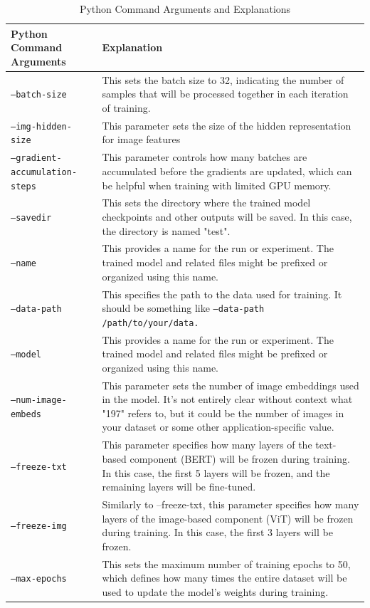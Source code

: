 \begin{table}[hbt]
\centering
\begin{tabular}{|p{6cm}|p{12cm}|}
\hline
\textbf{Python Command Arguments} & \textbf{Explanation} \\
\hline
\texttt{--batch-size} & This sets the batch size to 32, indicating the number of samples that will be processed together in each iteration of training. \\
\hline
\texttt{--img-hidden-size} & This parameter sets the size of the hidden representation for image features \\
\hline
\texttt{--gradient-accumulation-steps} & This parameter controls how many batches are accumulated before the gradients are updated, which can be helpful when training with limited GPU memory. \\
\hline
\texttt{--savedir} & This sets the directory where the trained model checkpoints and other outputs will be saved. In this case, the directory is named "test".\\
\hline
\texttt{--name} & This provides a name for the run or experiment. The trained model and related files might be prefixed or organized using this name. \\
\hline
\texttt{--data-path} & This specifies the path to the data used for training. It should be something like \texttt{--data-path /path/to/your/data.} \\
\hline
\texttt{--model} & This provides a name for the run or experiment. The trained model and related files might be prefixed or organized using this name. \\
\hline
\texttt{--num-image-embeds } & This parameter sets the number of image embeddings used in the model. It's not entirely clear without context what "197" refers to, but it could be the number of images in your dataset or some other application-specific value. \\
\hline
\texttt{--freeze-txt} & This parameter specifies how many layers of the text-based component (BERT) will be frozen during training. In this case, the first 5 layers will be frozen, and the remaining layers will be fine-tuned. \\
\hline
\texttt{--freeze-img} & Similarly to --freeze-txt, this parameter specifies how many layers of the image-based component (ViT) will be frozen during training. In this case, the first 3 layers will be frozen.\\
\hline
\texttt{--max-epochs} & This sets the maximum number of training epochs to 50, which defines how many times the entire dataset will be used to update the model's weights during training. \\
\hline
\end{tabular}
\caption{Python Command Arguments and Explanations}
\label{tab:python-arguments}
\end{table}

